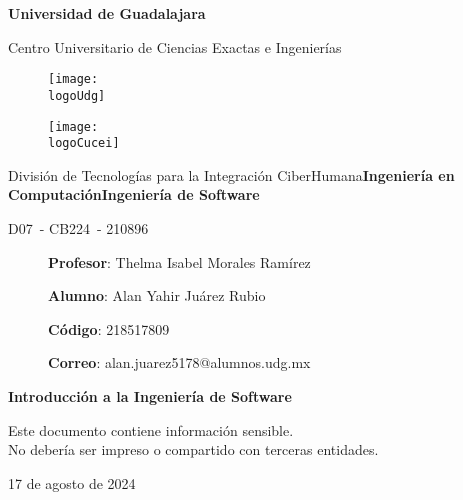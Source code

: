 \documentclass[11pt, a4paper]{article} %
\date{}
\title{\fontsize{24}{28.8}\selectfont \theTitle}
\author{\theAuthor}
\affil{}
\makeatletter
\newcommand{\logoUdg}{logo-udg.jpg}
\newcommand{\logoCucei}{logo-cucei.jpg}
\newcommand{\universidad}{Universidad de Guadalajara}
\newcommand{\cede}{Centro Universitario de Ciencias Exactas e Ingenierías}
\newcommand{\materia}{Ingeniería de Software}
\newcommand{\carrera}{Ingeniería en Computación}
\newcommand{\division}{División de Tecnologías para la Integración CiberHumana}
\newcommand{\theTitle}{Introducción a la Ingeniería de Software}
\newcommand{\profesor}{Thelma Isabel Morales Ramírez}
\newcommand{\seccion}{D07}
\newcommand{\nrc}{210896}
\newcommand{\clave}{CB224}
\newcommand{\startDate}{17 de agosto de 2024}
\newcommand{\theAuthor}{Alan Yahir Juárez Rubio}
\newcommand{\theAuthorCode}{218517809}
\newcommand{\theAuthorMail}{alan.juarez5178@alumnos.udg.mx}
\newcommand{\nl}{\par
\vspace{0.4cm}}
\makeatother
\begin{document}

    \begin{titlepage}
        \centering
        {\huge\textbf{\universidad}}\par
        \vspace{0.6cm}
        {\LARGE{\cede}}
        \vfill

        \begin{figure}[h]
            \begin{minipage}[t]{0.45\textwidth}
                \centering
                \texttt{[image: \\logoUdg]}
            \end{minipage}
            \hfill
            \begin{minipage}[t]{0.45\textwidth}
                \centering
                \texttt{[image: \\logoCucei]}
            \end{minipage}
        \end{figure}
        \vfill

        \Large{ \division\vfill \textbf{\carrera}\vfill \textbf{\materia}\par\vspace{3pt} \seccion\ - \clave\ - \nrc\vfill }

        \begin{figure}[h]
            \centering
            \begin{minipage}[t]{0.75\textwidth}
                {\Large \textbf{Profesor}: \profesor\nl \textbf{Alumno}: \theAuthor\nl \textbf{Código}: \theAuthorCode\nl \textbf{Correo}: \theAuthorMail }
            \end{minipage}
        \end{figure}
        \vfill

        {\LARGE{\textbf{\theTitle}}}
        \vfill

        \begin{tcolorbox}
            [colback=red!5!white, colframe=red!75!black]
            \centering
            Este documento contiene información sensible.\\ No debería ser impreso o
            compartido con terceras entidades.
        \end{tcolorbox}
        \vfill
        {\large \startDate}\par
    \end{titlepage}
\end{document}

